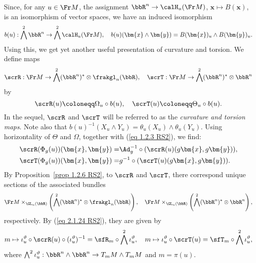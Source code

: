 \begin{rem}\label{rem 2.1.16 RS2}
    Since, for any $u\in\Fr M$, the assignment $\bbR^n\to \calH_u (\Fr M)$, $\bm{x}\mapsto B(\bm{x})$, is an isomorphism of vector spaces, we have an induced isomorphism 
    \[b(u):\bigwedge^2\bbR^n\to \bigwedge^2 \calH_u(\Fr M),\quad b(u)(\bm{x}\wedge\bm{y})=B(\bm{x})_u\wedge B(\bm{y})_u.\]
    Using this, we get yet another useful presentation of curvature and torsion. We define maps 
    \[\scrR:\Fr M\to \bigwedge^2(\bbR^n)^\ast \otimes\frakgl_n(\bbR),\quad \scrT:\Fr M\to \bigwedge^2(\bbR^n)^\ast\otimes\bbR^n\]
    by 
    \[\scrR(u)\coloneqq \Omega_u\circ b(u),\quad \scrT(u)\coloneqq \Theta_u\circ b(u).\label{eq 2.1.24 RS2}\]
    In the sequel, $\scrR$ and $\scrT$ will be referred to as the \emph{curvature and torsion maps}. Note also that $b(u)^{-1}(X_u\wedge Y_u)=\theta_u(X_u)\wedge\theta_u(Y_u)$. Using horizontality of $\Theta$ and $\Omega$, together with (\ref{eq 1.2.3 RS2}), we find:
    \begin{align}
        \scrR(\Phi_g(u))(\bm{x},\bm{y})=&\Ad_g^{-1}\circ (\scrR(u)(g\bm{x},g\bm{y})),\\
        \scrT(\Phi_g(u))(\bm{x},\bm{y})=& g^{-1}\circ (\scrT(u)(g\bm{x},g\bm{y})).
    \end{align}
    By Proposition~\ref{prop 1.2.6 RS2}, to $\scrR$ and $\scrT$, there correspond unique sections of the associated bundles 
    \[\Fr M\times_{\GL_n(\bbR)}\left(\bigwedge^2(\bbR^n)^\ast \otimes \frakgl_n(\bbR)\right),\quad \Fr M\times_{\GL_n(\bbR)}\left(\bigwedge^2(\bbR^n)^\ast \otimes\bbR^n\right),\]
    respectively. By (\ref{eq 2.1.24 RS2}), they are given by 
    \[m\mapsto \iota_u^\vartheta\circ \scrR(u)\circ (\iota_u^\vartheta)^{-1}=\sfR_m\circ\bigwedge^2 \iota_u^\vartheta,\quad m\mapsto \iota_u^\vartheta\circ\scrT(u)=\sfT_m\circ \bigwedge^2 \iota_u^\vartheta,\]
    where $\bigwedge^2 \iota_u^\vartheta:\bbR^n\wedge\bbR^n\to T_mM\wedge T_mM$ and $m=\pi(u)$.
\end{rem}


